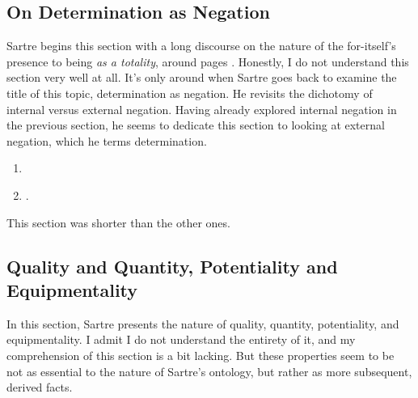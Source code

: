 \subsection{On Determination as Negation}

Sartre begins this section with a long discourse on the nature of the for-itself's presence to being \emph{as a totality}, around pages \autocite[256]{sartre}.
Honestly, I do not understand this section very well at all. It's only around \autocite[262]{sartre} when Sartre goes back to examine the title of this topic, determination as negation. He revisits the dichotomy of internal versus external negation. Having already explored internal negation in the previous section, he seems to dedicate this section to looking at external negation, which he terms determination.

\begin{enumerate}
  \item {}
  \item {}.
\end{enumerate}

\noindent
This section was shorter than the other ones.

\subsection{Quality and Quantity, Potentiality and Equipmentality}

In this \autocite[263 -- 285]{sartre} section, Sartre presents the nature of quality, quantity, potentiality, and equipmentality. I admit I do not understand the entirety of it, and my comprehension of this section is a bit lacking. But these properties seem to be not as essential to the nature of Sartre's ontology, but rather as more subsequent, derived facts.

